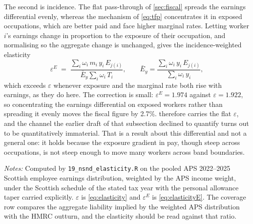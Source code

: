 The second is incidence. The flat pass-through of \cref{sec:fiscal} spreads the earnings differential evenly, whereas the mechanism of \cref{eq:tfp} concentrates it in exposed occupations, which are better paid and face higher marginal rates. Letting worker $i$'s earnings change in proportion to the exposure of their occupation, and normalising so the aggregate change is unchanged, gives the incidence-weighted elasticity
\begin{equation}\label{eq:elasticityE}
\varepsilon^{E} \;=\;
\frac{\sum_i \omega_i\, m_i\, y_i\, E_{j(i)}}
     {\bar{E}_y \sum_i \omega_i\, T_i},
\qquad
\bar{E}_y = \frac{\sum_i \omega_i\, y_i\, E_{j(i)}}{\sum_i \omega_i\, y_i},
\end{equation}
which exceeds $\varepsilon$ whenever exposure and the marginal rate both rise with earnings, as they do here. The correction is small: $\varepsilon^{E} = 1.974$ against $\varepsilon = 1.922$, so concentrating the earnings differential on exposed workers rather than spreading it evenly moves the fiscal figure by 2.7\%.  therefore carries the flat $\varepsilon$, and the channel the earlier draft of that subsection declined to quantify turns out to be quantitatively immaterial. That is a result about this differential and not a general one: it holds because the exposure gradient in pay, though steep across occupations, is not steep enough to move many workers across band boundaries.

\begin{table}[h]
\centering
\caption{Elasticity of Scottish NSND revenue to earnings}
\label{tab:elasticity}
\small

\begin{minipage}{0.92\textwidth}
\vspace{0.4em}\footnotesize
\textit{Notes:} Computed by \texttt{19\_nsnd\_elasticity.R} on the pooled APS
2022--2025 Scottish employee earnings distribution, weighted by the APS income weight, under the Scottish schedule of the stated tax year with the personal allowance taper carried explicitly. $\varepsilon$ is \cref{eq:elasticity} and $\varepsilon^{E}$ is \cref{eq:elasticityE}. The coverage row compares the aggregate liability implied by the weighted APS distribution with the HMRC outturn, and the elasticity should be read against that ratio.
\end{minipage}
\end{table}